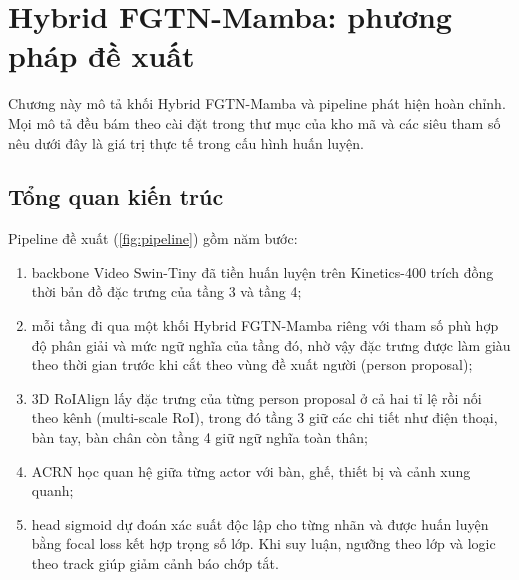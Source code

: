 \chapter{Hybrid FGTN-Mamba: phương pháp đề xuất}
\label{ch:method}

Chương này mô tả khối Hybrid FGTN-Mamba và pipeline phát hiện hoàn chỉnh. Mọi mô tả đều bám theo cài đặt trong thư mục  của kho mã và các siêu tham số nêu dưới đây là giá trị thực tế trong cấu hình huấn luyện.

\section{Tổng quan kiến trúc}
\label{sec:overview}

Pipeline đề xuất (\cref{fig:pipeline}) gồm năm bước:
\begin{enumerate}
  \item backbone Video Swin-Tiny \cite{liu2022videoswin} đã tiền huấn luyện trên Kinetics-400 trích đồng thời bản đồ đặc trưng của tầng 3 và tầng 4;
  \item mỗi tầng đi qua một khối Hybrid FGTN-Mamba riêng với tham số phù hợp độ phân giải và mức ngữ nghĩa của tầng đó, nhờ vậy đặc trưng được làm giàu theo thời gian trước khi cắt theo vùng đề xuất người (person proposal);
  \item 3D RoIAlign lấy đặc trưng của từng person proposal ở cả hai tỉ lệ rồi nối theo kênh (multi-scale RoI), trong đó tầng 3 giữ các chi tiết như điện thoại, bàn tay, bàn chân còn tầng 4 giữ ngữ nghĩa toàn thân;
  \item ACRN học quan hệ giữa từng actor với bàn, ghế, thiết bị và cảnh xung quanh;
  \item head sigmoid dự đoán xác suất độc lập cho từng nhãn và được huấn luyện bằng focal loss kết hợp trọng số lớp. Khi suy luận, ngưỡng theo lớp và logic theo track giúp giảm cảnh báo chớp tắt.
\end{enumerate}

